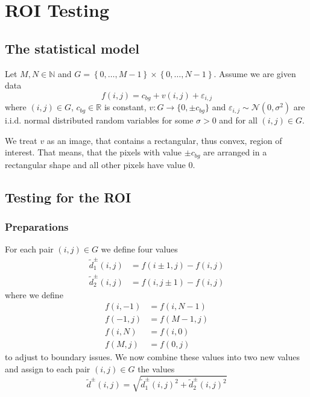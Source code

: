 \documentclass[a4paper,12pt]{article}
\theoremstyle{plain}
\theoremstyle{definition}
\theoremstyle{remark}
\begin{document}
\tableofcontents

\newpage

\section{ROI Testing}

\subsection{The statistical model}

Let $M, N \in \mathbb{N}$ and $G = \left\{ 0, \dots, M-1 \right\} \times  \left\{ 0, \dots, N-1 \right\}$. Assume we are given data
\begin{equation}\label{f}
	f(i, j) = c_{bg} + v(i, j) + \varepsilon_{i, j}
\end{equation}
where $(i, j) \in G$, $c_{bg} \in \mathbb{R}$ is constant, $v: G \to \{ 0, \pm c_{bg} \}$ and $\varepsilon_{i, j} \sim \mathcal{N}(0, \sigma^2)$ are i.i.d. normal distributed random variables for some $\sigma > 0$ and for all $(i, j) \in G$.

We treat $v$ as an image, that contains a rectangular, thus convex, region of interest. That means, that the pixels with value $\pm c_{bg}$ are arranged in a rectangular shape and all other pixels have value $0$.

\subsection{Testing for the ROI}

\subsubsection{Preparations}

For each pair $(i, j) \in G$ we define four values
\begin{align}
	\tilde{d}^\pm_1(i, j) &= f(i \pm 1, j) - f(i, j) \label{d1} \\
	\tilde{d}^\pm_2(i, j) &= f(i, j \pm 1) - f(i, j) \label{d2}
\end{align}
where we define
\begin{align*}
	f(i, -1) &= f(i, N-1) \\
	f(-1, j) &= f(M-1, j) \\
	f(i, N) &= f(i, 0) \\
	f(M, j) &= f(0, j)
\end{align*}
to adjust to boundary issues. We now combine these values into two new values and assign to each pair $(i, j) \in G$ the values
\begin{equation}\label{d_tilde}
	\tilde{d}^\pm(i, j) = \sqrt{\tilde{d}_1^\pm(i, j)^2 + \tilde{d}_2^\pm(i, j)^2}
\end{equation}
\end{document}
